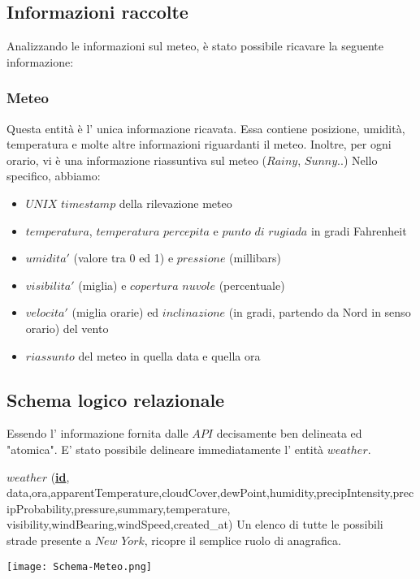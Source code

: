 \documentclass[12pt, a4paper]{scrartcl}
\begin{document}
\subsection*{Informazioni raccolte}
Analizzando le informazioni sul meteo, è stato possibile ricavare la seguente informazione:

\subsubsection*{Meteo}
Questa entità è l' unica informazione ricavata. Essa contiene posizione, umidità, temperatura e molte altre informazioni riguardanti il meteo. Inoltre, per ogni orario, vi è una informazione riassuntiva sul meteo ($Rainy$, $Sunny$..)
Nello specifico, abbiamo:
\begin{itemize}
\item $UNIX$ $timestamp$ della rilevazione meteo
\item $temperatura$, $temperatura$ $percepita$ e $punto$ $di$ $rugiada$ in gradi Fahrenheit
\item $umidita'$ (valore tra 0 ed 1) e $pressione$ (millibars)
\item $visibilita'$ (miglia) e $copertura$ $nuvole$ (percentuale)
\item $velocita'$ (miglia orarie) ed $inclinazione$ (in gradi, partendo da Nord in senso orario) del vento 
\item $riassunto$ del meteo in quella data e quella ora

\end{itemize}
\subsection*{Schema logico relazionale}
Essendo l' informazione fornita dalle $API$ decisamente ben delineata ed "atomica". E' stato possibile delineare immediatamente l' entità $weather$.
\newline
\newline

$weather$ (\textbf{\underline{id}}, data,ora,apparentTemperature,cloudCover,dewPoint,humidity,precipIntensity,precipProbability,pressure,summary,temperature,
visibility,windBearing,windSpeed,created\_at)
\newline
Un elenco di tutte le possibili strade presente a $New$ $York$, ricopre il semplice ruolo di anagrafica.

\begin{center}
\texttt{[image: Schema-Meteo.png]}
\end{center}
\end{document}

